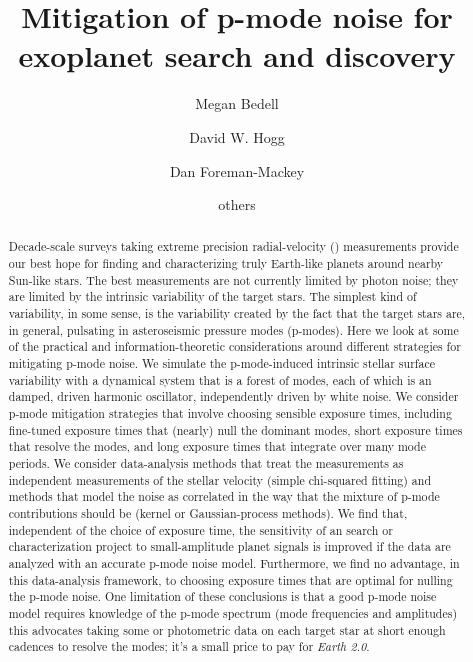 \documentclass[modern]{aastex62}
\begin{document}
\sloppy\sloppypar\raggedbottom\frenchspacing %

\title{\textbf{%
Mitigation of p-mode noise for exoplanet search and discovery
}}

\author[0000-0001-9907-7742]{Megan Bedell}
\affiliation{\flatiron}

\author[0000-0003-2866-9403]{David W. Hogg}
\affiliation{\flatiron}
\affiliation{\nyuccpp}
\affiliation{\nyucds}
\affiliation{\mpia}

\author[0000-0002-9328-5652]{Dan Foreman-Mackey}
\affiliation{\flatiron}

\author{others}


\begin{abstract}\noindent
Decade-scale surveys taking extreme precision radial-velocity (\EPRV)
measurements provide our best hope for finding and characterizing
truly Earth-like planets around nearby Sun-like stars.
The best \EPRV measurements are not currently limited by photon noise;
they are limited by the intrinsic variability of the target stars.
The simplest kind of variability, in some sense, is the variability
created by the fact that the target stars are, in general, pulsating
in asteroseismic pressure modes (p-modes).
Here we look at some of the practical and information-theoretic
considerations around different strategies for mitigating p-mode
noise.
We simulate the p-mode-induced intrinsic stellar surface variability
with a dynamical system that is a forest of modes, each of which is an
damped, driven harmonic oscillator, independently driven by white noise.
We consider p-mode mitigation strategies that involve choosing
sensible exposure times, including fine-tuned exposure times that
(nearly) null the dominant modes, short exposure times that resolve
the modes, and long exposure times that integrate over many mode
periods.
We consider data-analysis methods that treat the measurements as
independent measurements of the stellar velocity (simple chi-squared
fitting) and methods that model the noise as correlated in the way
that the mixture of p-mode contributions should be (kernel or
Gaussian-process methods).
We find that, independent of the choice of exposure time, the
sensitivity of an \EPRV search or characterization project to
small-amplitude planet signals is improved if the data are analyzed
with an accurate p-mode noise model.
Furthermore, we find no advantage, in this data-analysis framework, to
choosing exposure times that are optimal for nulling the p-mode noise.
One limitation of these conclusions is that a good p-mode noise model
requires knowledge of the p-mode spectrum (mode frequencies and
amplitudes) this advocates taking some \EPRV or photometric data on
each target star at short enough cadences to resolve the modes; it's
a small price to pay for \emph{Earth 2.0}.
\end{abstract}
\end{document}
